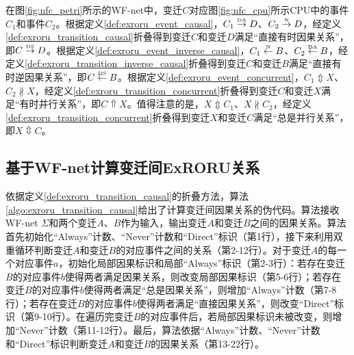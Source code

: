 \begin{example}\label{ex:exroru_transition}
在图\ref{fig:nfc_petri}所示的WF-net中，变迁$C$对应图\ref{fig:nfc_cpu}所示CPU中的事件$C_{1}$和事件$C_{2}$。根据定义\ref{def:exroru_event_causal}，$C_{1}\overset{\text{\tiny{DA}}}{\rightarrow}D$、$C_{2}\overset{\text{\tiny{N}}}{\rightarrow}D$，经定义\ref{def:exroru_transition_causal}折叠得到变迁$C$和变迁$D$满足“直接有时因果关系”，即$C\overset{\text{\tiny{DS}}}{\rightarrow}D$。根据定义\ref{def:exroru_event_inverse_causal}，$C_{1}\overset{\text{\tiny{N}}}{\leftarrow}B$、$C_{2}\overset{\text{\tiny{DA}}}{\leftarrow}B$，经定义\ref{def:exroru_transition_inverse_causal}折叠得到变迁$C$和变迁$B$满足“直接有时逆因果关系”，即$C\overset{\text{\tiny{DS}}}{\leftarrow}B$。根据定义\ref{def:exroru_event_concurrent}，$C_{1}\Updownarrow X$、$C_{2}\nparallel X$，经定义\ref{def:exroru_transition_concurrent}折叠得到变迁$C$和变迁$X$满足“有时并行关系”，即$C\Uparrow X$。值得注意的是，$X\Updownarrow C_{1}$、$X\nparallel C_{2}$，经定义\ref{def:exroru_transition_concurrent}折叠得到变迁$X$和变迁$C$满足“总是并行关系”，即$X\Updownarrow C$。
\end{example}

\subsection{基于WF-net计算变迁间ExRORU关系}\label{subsec:exroru_transition_computation}
依据定义\ref{def:exroru_transition_causal}的折叠方法，算法\ref{algo:exroru_transition_causal}给出了计算变迁间因果关系的伪代码。算法接收WF-net $\Sigma$和两个变迁$A$、$B$作为输入，输出变迁$A$和变迁$B$之间的因果关系。算法首先初始化“Always”计数、“Never”计数和“Direct”标识（第1行），接下来利用双重循环判断变迁$A$和变迁$B$的对应事件之间的关系（第2-12行）。对于变迁$A$的每一个对应事件$a$，初始化局部因果标识和局部“Always”标识（第2-3行）：若存在变迁$B$的对应事件$b$使得两者满足因果关系，则改变局部因果标识（第5-6行）；若存在变迁$B$的对应事件$b$使得两者满足“总是因果关系”，则增加“Always”计数（第7-8行）；若存在变迁$B$的对应事件$b$使得两者满足“直接因果关系”，则改变“Direct”标识（第9-10行）。在遍历完变迁$B$的对应事件后，若局部因果标识未被改变，则增加“Never”计数（第11-12行）。最后，算法依据“Always”计数、“Never”计数和“Direct”标识判断变迁$A$和变迁$B$的因果关系（第13-22行）。

